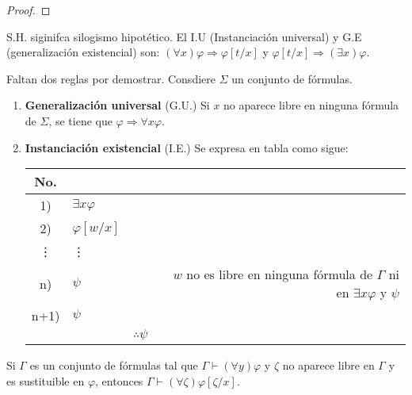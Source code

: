 \documentclass[12pt]{report}
\newcounter{it}
\theoremstyle{largebreak}
\begin{document}
\begin{proof}
    \end{proof}

    \begin{obs}
        S.H. siginifca silogismo hipotético. El I.U (Instanciación universal) y G.E (generalización existencial) son:
        $(\forall x)\varphi\Rightarrow \varphi[t/x]$ y $\varphi[t/x]\Rightarrow (\exists x)\varphi$.
    \end{obs}

    Faltan dos reglas por demostrar. Consdiere $\Sigma$ un conjunto de fórmulas.
    \begin{enumerate}
        \item \textbf{Generalización universal} (G.U.) Si $x$ no aparece libre en ninguna fórmula de $\Sigma$, se tiene que $\varphi\Rightarrow\forall x\varphi$.
        \item \textbf{Instanciación existencial} (I.E.) Se expresa en tabla como sigue:
        \begin{center}
            \begin{tabular}{ c  l  l  r  }
                \hline
                No. &  &  &  \\
                \hline
                1) & $\exists x\varphi$ &  &  \\
                2) & $\varphi[w/x]$ &  &  \\
                \vdots & \vdots &  &  \\
                n) & $\psi$ &  & $w$ no es libre en ninguna fórmula de $\Gamma$ ni en $\exists x\varphi$ y $\psi$\\
                \hline
                n+1) & $\psi$ &  &  \\
                \hline
                  &  &  $\therefore \psi $ &  \\
            \end{tabular}
        \end{center}
    \end{enumerate}

    \begin{lema}
        Si $\Gamma$ es un conjunto de fórmulas tal que $\Gamma\vdash (\forall y)\varphi$ y $\zeta$ no aparece libre en $\Gamma$ y es sustituible en $\varphi$, entonces $\Gamma\vdash(\forall \zeta)\varphi[\zeta/x]$.
    \end{lema}
\end{document}
